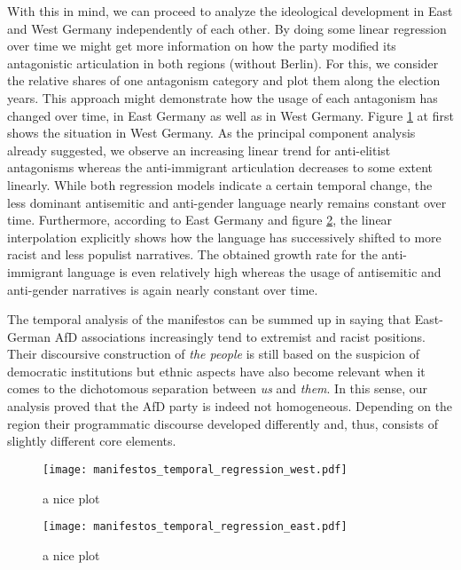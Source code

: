 \documentclass[a4paper]{scrreprt}
\begin{document}
With this in mind, we can proceed to analyze the ideological development in East and West Germany independently of each other. By doing some linear regression over time we might get more information on how the party modified its antagonistic articulation in both regions (without Berlin). For this, we consider the relative shares of one antagonism category and plot them along the election years. This approach might demonstrate how the usage of each antagonism has changed over time, in East Germany as well as in West Germany. Figure \ref{fig:fig7} at first shows the situation in West Germany. As the principal component analysis already suggested, we observe an increasing linear trend for anti-elitist antagonisms whereas the anti-immigrant articulation decreases to some extent linearly. While both regression models indicate a certain temporal change, the less dominant antisemitic and anti-gender language nearly remains constant over time. Furthermore, according to East Germany and figure \ref{fig:fig8}, the linear interpolation explicitly shows how the language has successively shifted to more racist and less populist narratives. The obtained growth rate for the anti-immigrant language is even relatively high whereas the usage of antisemitic and anti-gender narratives is again nearly constant over time.\par
The temporal analysis of the manifestos can be summed up in saying that East-German AfD associations increasingly tend to extremist and racist positions. Their discoursive construction of {\em the people} is still based on the suspicion of democratic institutions but ethnic aspects have also become relevant when it comes to the dichotomous separation between {\em us} and {\em them}. In this sense, our analysis proved that the AfD party is indeed not homogeneous. Depending on the region their programmatic discourse developed differently and, thus, consists of slightly different core elements.
\begin{figure}[ht]
    \centering
    \texttt{[image: manifestos\_temporal\_regression\_west.pdf]}
    \caption{a nice plot}
    \label{fig:fig7}
\end{figure}
\begin{figure}[ht]
    \centering
    \texttt{[image: manifestos\_temporal\_regression\_east.pdf]}
    \caption{a nice plot}
    \label{fig:fig8}
\end{figure}
\end{document}
